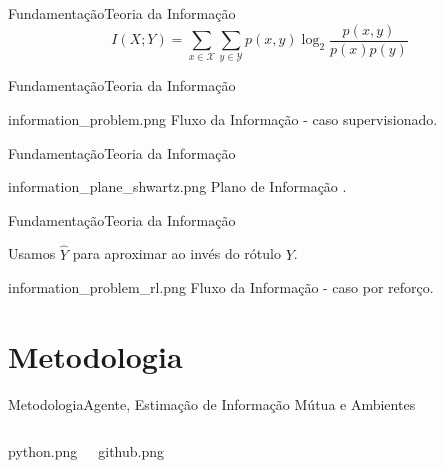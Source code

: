 \documentclass[
11pt,notheorems,hyperref={pdfauthor=Autor}
]{beamer}
\begin{document}
\begin{frame}{Fundamentação}{Teoria da Informação}
    \pause
    \LARGE{
    }
    \LARGE{
    }
    \LARGE{
        \begin{equation*}
            I(X;Y) = \sum_{x\in \mathcal{X}} \sum_{y\in \mathcal{Y}} p(x,y) \log_2 \frac{p(x,y)}{p(x)p(y)}
        \end{equation*}
    }
\end{frame}

\begin{frame}{Fundamentação}{Teoria da Informação}
    \pause
    \centering
    \begin{minipage}{0.9\textwidth}
        \FigureWithFallbackCaption
        {information_problem.png}
        {Fluxo da Informação - caso supervisionado.}
    \end{minipage}
\end{frame}

\begin{frame}{Fundamentação}{Teoria da Informação}
    \pause
    \centering
    \begin{minipage}{0.7\textwidth}
        \FigureWithFallbackCaption
        {information_plane_shwartz.png}
        {Plano de Informação \cite{shwartz-ziv_opening_2017}.}
    \end{minipage}
\end{frame}

\begin{frame}{Fundamentação}{Teoria da Informação}
    \pause
    \begin{justify}
        Usamos $\hat Y$ para aproximar ao invés do rótulo $Y$.
    \end{justify}

    \pause
    \centering
    \begin{minipage}{0.8\textwidth}
        \FigureWithFallbackCaption
        {information_problem_rl.png}
        {Fluxo da Informação - caso por reforço.}
    \end{minipage}
\end{frame}

\section{Metodologia}
\begin{frame}{Metodologia}{Agente, Estimação de Informação Mútua e Ambientes}
\pause
    \begin{columns}[T]
    \FigureWithFallbackCaption
    {python.png}
    {}
    \pause

    \FigureWithFallbackCaption
    {github.png}
    {}
\end{columns}
\end{frame}
\end{document}
